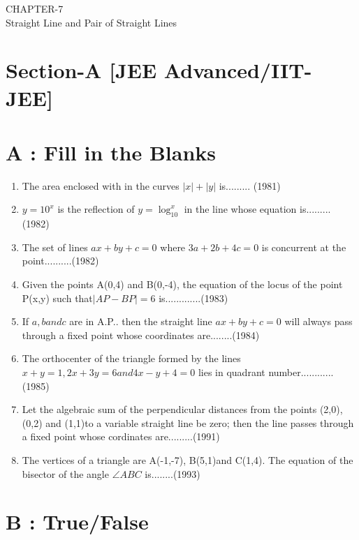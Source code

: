 \documentclass[12pt]{article}
\begin{document}
\begin{center}
\textbf\large{CHAPTER-7 \\ Straight Line and Pair of Straight Lines}

\end{center}

\section*{Section-A    [JEE Advanced/IIT-JEE]}
\section*{A    :  Fill in the Blanks}
\begin{enumerate}

\item  The area enclosed with in the curves $|x|+|y|$ is.........  (1981) \\
\item  $y=10^x$ is the reflection of $y=\log_10^x $ in the line whose equation is.........(1982)\\
\item The set of lines $ax+by+c=0$ where $3a+2b+4c=0$ is concurrent at the point..........(1982)\\
\item  Given the points A(0,4) and B(0,-4), the equation of the locus of the point P(x,y) such that$|AP-BP|=6$ is.............(1983)\\
\item  If $a,b and c$ are in A.P.. then the straight line $ax+by+c=0$ will always pass through a fixed point whose coordinates are........(1984)\\
\item  The orthocenter of the triangle formed by the lines $x+y=1, 2x+3y=6  and  4x-y+4=0$ lies in quadrant number............(1985)\\
\item Let the algebraic sum of the perpendicular distances from the points (2,0), (0,2) and (1,1)to a variable straight line be zero; then the line passes through a fixed point whose cordinates are.........(1991)\\
\item The vertices of a triangle are  A(-1,-7), B(5,1)and C(1,4). The equation of the bisector of the angle $\angle{ABC}$ is........(1993)

\end{enumerate}

\section*{B    :    True/False}
\end{document}
